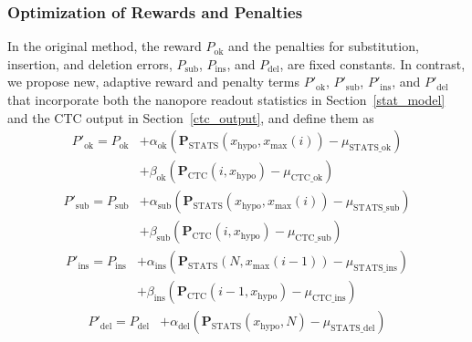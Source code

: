\documentclass[sotsuron]{kuee}
\begin{document}
\subsubsection{Optimization of Rewards and Penalties} \label{reward_penalty_optimization}
In the original method, the reward $P_{\mathrm{ok}}$ and the penalties for substitution, insertion, and deletion
errors, $P_{\mathrm{sub}}$, $P_{\mathrm{ins}}$, and $P_{\mathrm{del}}$, are fixed constants.
In contrast, we propose new, adaptive reward and penalty terms $P'_{\mathrm{ok}}$, $P'_{\mathrm{sub}}$,
$P'_{\mathrm{ins}}$, and $P'_{\mathrm{del}}$ that incorporate both the nanopore readout statistics in
Section~\ref{stat_model} and the CTC output in Section~\ref{ctc_output}, and define them as
\begin{equation}
  \begin{split}
    P'_{\mathrm{ok}} = P_{\mathrm{ok}} &+ \alpha_{\mathrm{ok}}(\bm{P}_{\mathrm{STATS}}(x_{\mathrm{hypo}}, x_{\mathrm{max}}(i))-\mu_{\mathrm{STATS}\_\mathrm{ok}}) \label{opt1} \\ 
     &+ \beta_{\mathrm{ok}}(\bm{P}_{\mathrm{CTC}}(i, x_{\mathrm{hypo}})-\mu_{\mathrm{CTC}\_\mathrm{ok}}) 
  \end{split}
\end{equation}
\begin{equation}
  \begin{split}
    P'_{\mathrm{sub}} = P_{\mathrm{sub}} &+ \alpha_{\mathrm{sub}}(\bm{P}_{\mathrm{STATS}}(x_{\mathrm{hypo}}, x_{\mathrm{max}}(i))-\mu_{\mathrm{STATS}\_\mathrm{sub}}) \label{opt2} \\
    &+ \beta_{\mathrm{sub}}(\bm{P}_{\mathrm{CTC}}(i, x_{\mathrm{hypo}})-\mu_{\mathrm{CTC}\_\mathrm{sub}})
  \end{split}
\end{equation}
\begin{equation}
  \begin{split}
    P'_{\mathrm{ins}} = P_{\mathrm{ins}} &+ \alpha_{\mathrm{ins}}(\bm{P}_{\mathrm{STATS}}(N, x_{\mathrm{max}}(i-1))-\mu_{\mathrm{STATS}\_\mathrm{ins}}) \label{opt3}\\
    &+ \beta_{\mathrm{ins}}(\bm{P}_{\mathrm{CTC}}(i-1, x_{\mathrm{hypo}})-\mu_{\mathrm{CTC}\_\mathrm{ins}})
  \end{split}
\end{equation}
\begin{equation}
  \begin{split}
    P'_{\mathrm{del}} = P_{\mathrm{del}} &+ \alpha_{\mathrm{del}}(\bm{P}_{\mathrm{STATS}}(x_{\mathrm{hypo}}, N)-\mu_{\mathrm{STATS}\_\mathrm{del}}) \label{opt4}
  \end{split}
\end{equation}
\end{document}
